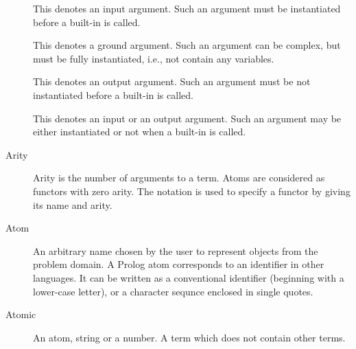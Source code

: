 \begin{description}

\item[]
This denotes an input argument. Such an argument must be instantiated before
a built-in is called.

\item[]
This denotes a ground argument. Such an argument can be complex,
but must be fully instantiated, i.e., not contain any variables.

\item[]
This denotes an output argument. Such an argument must be not
instantiated before a built-in is called.

\item[]
This denotes an input or an output argument. Such an argument may be either
instantiated or not  when a built-in is called.


\item[Arity]
Arity is the number of arguments to a term.
Atoms are considered as functors with zero arity.
The notation 
is used to specify a functor by giving its name and arity.

\item[Atom]
An arbitrary name chosen by the user to represent objects from the
problem domain.
A Prolog atom corresponds to an identifier in other languages.  It can be
written as a conventional identifier (beginning with a lower-case letter), or
a character sequnce enclosed in single quotes.

\item[Atomic]
An atom, string or a number. A term which does not contain other terms.


\end{description}
